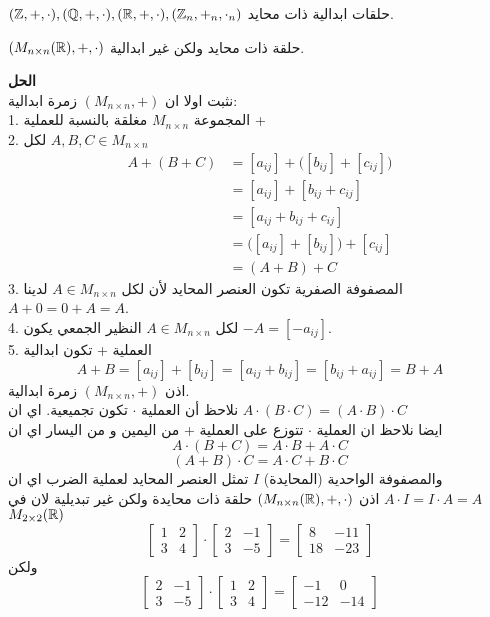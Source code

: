 \begin{example}
	$(\mathbb{Z}, +, \cdot), (\mathbb{Q}, +, \cdot), (\mathbb{R}, +, \cdot), (\mathbb{Z}_n, +_n, \cdot_n)$ حلقات ابدالية ذات محايد.
\end{example}
\newpage
\begin{example}
	$(M_{n\times n}(\mathbb{R}), +, \cdot)$ حلقة ذات محايد ولكن غير ابدالية.
\end{example}
\noindent
\textbf{الحل}\\
\noindent
نثبت اولا ان 
$(M_{n\times n}, +)$ زمرة ابدالية:\\
1. المجموعة $M_{n\times n}$ مغلقة بالنسبة للعملية +\\
2. لكل $A, B, C\in M_{n\times n}$ 
\begin{align*}
	A + (B + C) &= [a_{ij}] + \Big([b_{ij}] + [c_{ij}]\Big)\\
	&= [a_{ij}] + [b_{ij} + c_{ij}]\\
	&= [a_{ij} + b_{ij} + c_{ij}]\\
	&= \Big([a_{ij}] + [b_{ij}]\Big) + [c_{ij}]\\
	&= (A + B) + C
\end{align*}
3. المصفوفة الصفرية تكون العنصر المحايد لأن لكل $A\in M_{n\times n}$ لدينا $A + 0 = 0 + A = A$.\\
4. لكل $A\in M_{n\times n}$ النظير الجمعي يكون $-A = [-a_{ij}]$.\\
5. العملية + تكون ابدالية 
\[
A + B = [a_{ij}] + [b_{ij}] = [a_{ij} + b_{ij}] = [b_{ij} + a_{ij}] = B + A
\] 
اذن $(M_{n\times n}, +)$ زمرة ابدالية.\\
نلاحظ أن العملية $\cdot$ تكون تجميعية. اي ان
$
A\cdot (B\cdot C) = (A\cdot B)\cdot C
$\\
ايضا نلاحظ ان العملية $\cdot$ تتوزع على العملية + من اليمين و من اليسار اي ان
\[
A\cdot (B+C) = A\cdot B + A\cdot C
\]
\[
(A + B) \cdot C = A\cdot C + B\cdot C
\]
والمصفوفة الواحدية (المحايدة) $I$ تمثل العنصر المحايد لعملية الضرب اي ان 
$A\cdot I = I \cdot A = A$
اذن $(M_{n\times n}(\mathbb{R}), +, \cdot)$ حلقة ذات محايدة ولكن غير تبديلية لان في 
$M_{2\times 2}(\mathbb{R})$
\[
\begin{bmatrix}
	1 & 2\\
	3 & 4
\end{bmatrix}\cdot
\begin{bmatrix}
	2 & -1\\
	3 & -5
\end{bmatrix}
=
\begin{bmatrix}
	8 & -11\\
	18 & -23
\end{bmatrix}
\]
ولكن
\[
\begin{bmatrix}
	2 & -1\\
	3 & -5
\end{bmatrix}\cdot
\begin{bmatrix}
	1 & 2\\
	3 & 4
\end{bmatrix}=
\begin{bmatrix}
	-1 & 0\\
	-12 & -14
\end{bmatrix}
\]


